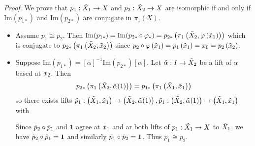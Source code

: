 \documentclass{natsirt}
\begin{document}
\textit{Proof.} We prove that $p_1: \Tilde{X}_1\>X$ and $p_2:\Tilde{X}_2 \> X$ are isomorphic if and only if $\text{Im}(p_{1*})$ and $\text{Im}(p_{2*})$ are conjugate in $\pi_1(X)$.
\begin{itemize}
    \item Assume $p_1\cong p_2$. Then $\text{Im}(p_{1*})= \text{Im}(p_{2*}\circ \phi_*) = p_{2*} \pr{\pi_1\pr{\Tilde{X}_2, \phi\pr{\Tilde{x}_1}}}$ which is conjugate to $p_{2*}\pr{\pi_1\pr{\Tilde{X}_2, \Tilde{x}_2}}$ since $p_2 \circ \phi \pr{\Tilde{x}_1} = p_1\pr{\Tilde{x}_1} = x_0 = p_2\pr{\Tilde{x}_2}$.
    \item Suppose $\text{Im}(p_{1*}) = [\alpha]^{-1} \text{Im}(p_{2*}) [\alpha] $. Let $\Tilde{\alpha}: I\> \Tilde{X}_2$ be a lift of $\alpha$ based at $\Tilde{x}_2$. Then
    \begin{align*}
        p_{2*}\pr{\pi_1\pr{\Tilde{X}_2, \Tilde{\alpha}(1)}} = p_{1*}\pr{\pi_1\pr{\Tilde{X}_1, \Tilde{x}_1}}
    \end{align*}
    so there exists lifts $\Tilde{p}_1: \pr{\Tilde{X}_1,\Tilde{x}_1}\> \pr{\Tilde{X}_2,\Tilde{\alpha}(1)}, \Tilde{p}_1: \pr{\Tilde{X}_2,\Tilde{\alpha}(1)}\> \pr{\Tilde{X}_1,\Tilde{x}_1}$ with
    \begin{center}
    \end{center}
    Since $\Tilde{p}_2\circ \Tilde{p}_1$ and $\textbf{1}$ agree at $\Tilde{x}_1$ and ar both lifts of $p_1: \Tilde{X}_1 \> X$ to $\Tilde{X}_1$, we have $\Tilde{p}_2\circ \Tilde{p}_1 = \textbf{1}$ and similarly $\Tilde{p}_1\circ \Tilde{p}_2 = \textbf{1}$. Thus $p_1\cong p_2$.\QED
\end{itemize}
\end{document}
